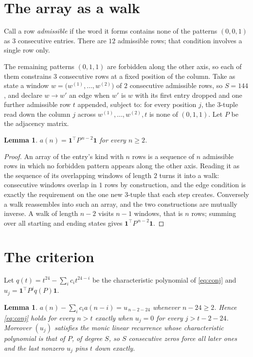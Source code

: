 \documentclass[11pt,a4paper]{article}
\theoremstyle{plain}
\newtheorem{lemma}[theorem]{Lemma}
\theoremstyle{definition}
\begin{document}
\section{The array as a walk}

Call a row \emph{admissible} if the word it forms contains none of the patterns
$(0,0,1)$ as $3$ consecutive entries. There are $12$ admissible rows; that condition
involves a single row only.

The remaining patterns $(0,1,1)$ are forbidden along the other axis, so each of them
constrains $3$ consecutive rows at a fixed position of the column. Take as state a
window $w=\bigl(w^{(1)},\dots,w^{(2)}\bigr)$ of $2$ consecutive admissible
rows, so $S=144$, and declare $w\to w'$ an edge when $w'$ is $w$ with its first entry
dropped and one further admissible row $t$ appended, subject to: for every position
$j$, the $3$-tuple read down the column $j$ across $w^{(1)},\dots,w^{(2)},t$
is none of $(0,1,1)$. Let $P$ be the adjacency matrix.

\begin{lemma}\label{lem:walk}
$a(n)=\mathbf{1}^{\!\top}P^{\,n-2}\mathbf{1}$ for every $n\ge2$.
\end{lemma}

\begin{proof}
An array of the entry's kind with $n$ rows is a sequence of $n$ admissible rows in
which no forbidden pattern appears along the other axis. Reading it as the sequence of its
overlapping windows of length $2$ turns it into a walk: consecutive windows overlap in
$1$ rows by construction, and the edge condition is exactly the requirement on the one
new $3$-tuple that each step creates. Conversely a walk reassembles into such an array,
and the two constructions are mutually inverse. A walk of length $n-2$ visits $n-1$
windows, that is $n$ rows; summing over all starting and ending states gives
$\mathbf{1}^{\!\top}P^{\,n-2}\mathbf{1}$.
\end{proof}

\section{The criterion}

Let $q(t)=t^{24}-\sum_i c_i t^{24-i}$ be the characteristic polynomial of
\eqref{eq:conj} and $u_j=\mathbf{1}^{\!\top}P^{j}q(P)\mathbf{1}$.

\begin{lemma}\label{lem:crit}
$a(n)-\sum_i c_i a(n-i)=u_{\,n-2-24}$ whenever $n-24\ge2$. Hence
\eqref{eq:conj} holds for every $n>t$ exactly when $u_j=0$ for every
$j>t-2-24$. Moreover $(u_j)$ satisfies the monic linear recurrence whose
characteristic polynomial is that of $P$, of degree $S$, so $S$ consecutive zeros force all
later ones and the last nonzero $u_j$ pins $t$ down exactly.
\end{lemma}
\end{document}
